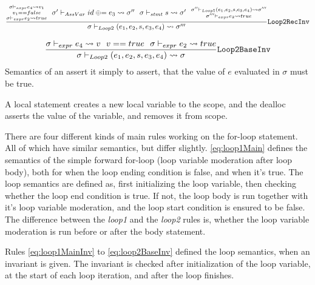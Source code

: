 \begin{equation} \label{eq:loop2RecInv}
    \frac{\substack{\sigma \vdash_{expr} e_4 \leadsto v_1 \\
            v_1 == false \\
            \sigma \vdash_{expr} e_2 \leadsto true} ~~
        \sigma' \vdash_{AssVar} id \oplus{\kern-5.0pt}= e_3 \leadsto \sigma'' ~~
        \sigma \vdash_{stmt} s \leadsto \sigma' ~~
        \substack{\sigma'' \vdash_{Loop1} (e_1, e_2, s, e_3, e_4) \leadsto \sigma''' \\
            \sigma''' \vdash_{expr} e_2 \leadsto true}}
    {\sigma \vdash_{Loop2} (e_1, e_2, s, e_3, e_4) \leadsto \sigma'''}
    \text{\texttt{Loop2RecInv}}
\end{equation}

\begin{equation} \label{eq:loop2BaseInv}
    \frac{\sigma \vdash_{expr} e_4 \leadsto v ~~
        v == true ~~
        \sigma \vdash_{expr} e_2 \leadsto true}
    {\sigma \vdash_{Loop2} (e_1, e_2, s, e_3, e_4) \leadsto \sigma}
    \text{\texttt{Loop2BaseInv}}
\end{equation}
\noindent
Semantics of an assert it simply to assert, that the value of $e$ evaluated in $\sigma$ must
be true.

A local statement creates a new local variable to the scope, and
the dealloc asserts the value of the variable, and removes it from scope.

There are four different kinds of main rules working on the for-loop statement. All of which
have similar semantics, but differ slightly.
\eqref{eq:loop1Main} defines the semantics of the simple
forward for-loop (loop variable moderation after loop body), both for when the loop ending
condition is false, and when it's true. The loop semantics are defined as, first initializing
the loop variable, then checking whether the loop end condition is true. If not, the loop body
is run together with it's loop variable moderation, and the loop start condition is ensured to
be false. The difference between the \emph{loop1} and the \emph{loop2} rules is, whether
the loop variable moderation is run before or after the body statement.

Rules \eqref{eq:loop1MainInv} to \eqref{eq:loop2BaseInv} defined the loop semantics, when an
invariant is given. The invariant is checked after initialization of the loop variable, at
the start of each loop iteration, and after the loop finishes.

